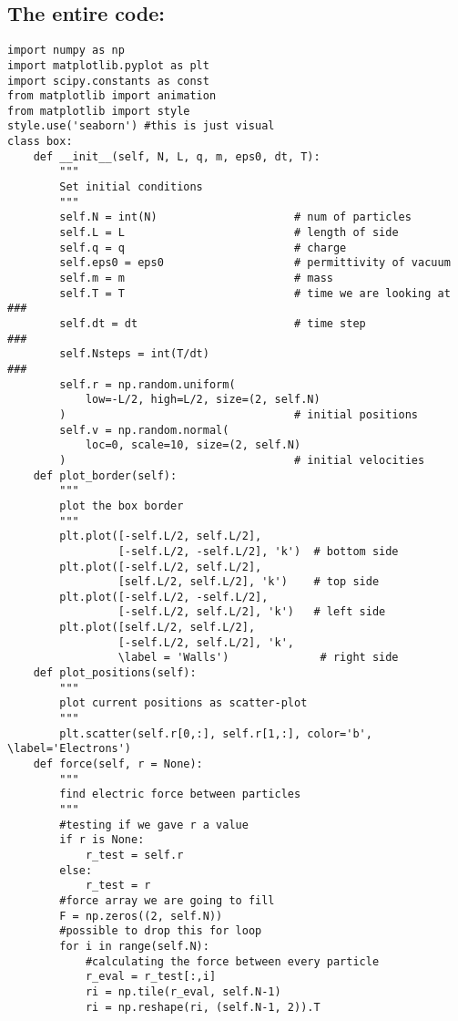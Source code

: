 \documentclass[%
oneside,                 %
final,                   %
10pt]{article}
\begin{document}
\subsection{The entire code:}
\begin{verbatim}
import numpy as np
import matplotlib.pyplot as plt
import scipy.constants as const
from matplotlib import animation
from matplotlib import style
style.use('seaborn') #this is just visual
class box:
    def __init__(self, N, L, q, m, eps0, dt, T):
        """
        Set initial conditions
        """
        self.N = int(N)                     # num of particles
        self.L = L                          # length of side
        self.q = q                          # charge
        self.eps0 = eps0                    # permittivity of vacuum
        self.m = m                          # mass
        self.T = T                          # time we are looking at ###
        self.dt = dt                        # time step              ###
        self.Nsteps = int(T/dt)                                      ###
        self.r = np.random.uniform(
            low=-L/2, high=L/2, size=(2, self.N)
        )                                   # initial positions
        self.v = np.random.normal(
            loc=0, scale=10, size=(2, self.N)
        )                                   # initial velocities
    def plot_border(self):
        """
        plot the box border
        """
        plt.plot([-self.L/2, self.L/2],
                 [-self.L/2, -self.L/2], 'k')  # bottom side
        plt.plot([-self.L/2, self.L/2],
                 [self.L/2, self.L/2], 'k')    # top side
        plt.plot([-self.L/2, -self.L/2],
                 [-self.L/2, self.L/2], 'k')   # left side
        plt.plot([self.L/2, self.L/2],
                 [-self.L/2, self.L/2], 'k',
                 \label = 'Walls')              # right side
    def plot_positions(self):
        """
        plot current positions as scatter-plot
        """
        plt.scatter(self.r[0,:], self.r[1,:], color='b', \label='Electrons')
    def force(self, r = None):
        """
        find electric force between particles
        """
        #testing if we gave r a value
        if r is None:
            r_test = self.r
        else:
            r_test = r
        #force array we are going to fill
        F = np.zeros((2, self.N))
        #possible to drop this for loop
        for i in range(self.N):
            #calculating the force between every particle
            r_eval = r_test[:,i]
            ri = np.tile(r_eval, self.N-1)
            ri = np.reshape(ri, (self.N-1, 2)).T

\end{verbatim}
\end{document}
